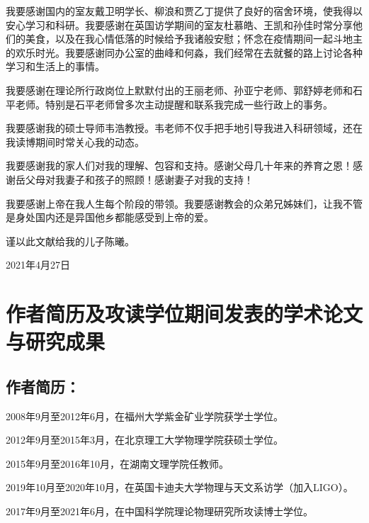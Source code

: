 我要感谢国内的室友戴卫明学长、柳浪和贾乙丁提供了良好的宿舍环境，使我得以安心学习和科研。我要感谢在英国访学期间的室友杜慕皓、王凯和孙佳时常分享他们的美食，以及在我心情低落的时候给予我诸般安慰；怀念在疫情期间一起斗地主的欢乐时光。我要感谢同办公室的曲峰和何淼，我们经常在去就餐的路上讨论各种学习和生活上的事情。

我要感谢在理论所行政岗位上默默付出的王丽老师、孙亚宁老师、郭舒婷老师和石平老师。特别是石平老师曾多次主动提醒和联系我完成一些行政上的事务。

我要感谢我的硕士导师韦浩教授。韦老师不仅手把手地引导我进入科研领域，还在我读博期间时常关心我的动态。

我要感谢我的家人们对我的理解、包容和支持。感谢父母几十年来的养育之恩！感谢岳父母对我妻子和孩子的照顾！感谢妻子对我的支持！

我要感谢上帝在我人生每个阶段的带领。我要感谢教会的众弟兄姊妹们，让我不管是身处国内还是异国他乡都能感受到上帝的爱。

谨以此文献给我的儿子陈曦。

\vspace{1cm}
\hspace{10cm} 2021年4月27日

\chapter{作者简历及攻读学位期间发表的学术论文与研究成果}

\section*{作者简历：}

2008年9月至2012年6月，在福州大学紫金矿业学院获学士学位。

2012年9月至2015年3月，在北京理工大学物理学院获硕士学位。

2015年9月至2016年10月，在湖南文理学院任教师。

2019年10月至2020年10月，在英国卡迪夫大学物理与天文系访学（加入LIGO）。

2017年9月至2021年6月，在中国科学院理论物理研究所攻读博士学位。

